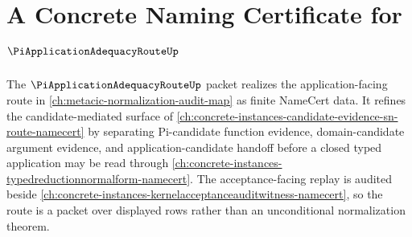 \chapter{A Concrete Naming Certificate for $\PiApplicationAdequacyRouteUp$}
\label{ch:concrete-instances-pi-application-adequacy-route-namecert}

The $\PiApplicationAdequacyRouteUp$ packet realizes the application-facing route in \autoref{ch:metacic-normalization-audit-map} as finite NameCert data. It refines the candidate-mediated surface of \autoref{ch:concrete-instances-candidate-evidence-sn-route-namecert} by separating Pi-candidate function evidence, domain-candidate argument evidence, and application-candidate handoff before a closed typed application may be read through \autoref{ch:concrete-instances-typedreductionnormalform-namecert}. The acceptance-facing replay is audited beside \autoref{ch:concrete-instances-kernelacceptanceauditwitness-namecert}, so the route is a packet over displayed rows rather than an unconditional normalization theorem.

